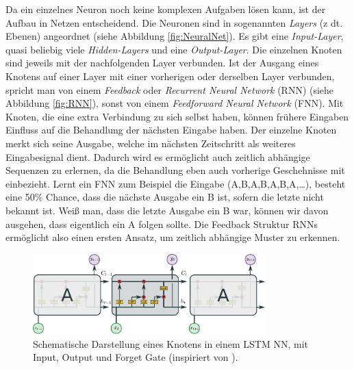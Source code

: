     Da ein einzelnes Neuron noch keine komplexen Aufgaben lösen kann, ist der Aufbau in Netzen entscheidend.
    Die Neuronen sind in sogenannten \textit{Layers} (z dt. Ebenen) angeordnet (siehe Abbildung \ref{fig:NeuralNet}).
    Es gibt eine \textit{Input-Layer}, quasi beliebig viele \textit{Hidden-Layers} und eine \textit{Output-Layer}.
    Die einzelnen Knoten sind jeweils mit der nachfolgenden Layer verbunden.
    Ist der Ausgang eines Knotens auf einer Layer mit einer vorherigen oder derselben Layer verbunden, spricht man von einem \textit{Feedback} oder \textit{Recurrent Neural Network} (RNN) (siehe Abbildung \ref{fig:RNN}), sonst von einem \textit{Feedforward Neural Network} (FNN). 
    Mit Knoten, die eine extra Verbindung zu sich selbst haben, können frühere Eingaben Einfluss auf die Behandlung der nächsten Eingabe haben.
    Der einzelne Knoten merkt sich seine Ausgabe, welche im nächsten Zeitschritt als weiteres Eingabesignal dient.
    Dadurch wird es ermöglicht auch zeitlich abhängige Sequenzen zu erlernen, da die Behandlung eben auch vorherige Geschehnisse mit einbezieht.
    Lernt ein FNN zum Beispiel die Eingabe (A,B,A,B,A,B,A,\dots), besteht eine 50\% Chance, dass die nächste Ausgabe ein B ist, sofern die letzte nicht bekannt ist.
    Weiß man, dass die letzte Ausgabe ein B war, können wir davon ausgehen, dass eigentlich ein A folgen sollte.
    Die Feedback Struktur RNNs ermöglicht also einen ersten Ansatz, um zeitlich abhängige Muster zu erkennen.
    
    	\begin{figure}[ht]
    		\centering
    		\includegraphics[width=0.8\textwidth]{images/Illustrationen/LSTM}
    		\caption{Schematische Darstellung eines Knotens in einem LSTM NN, mit Input, Output und Forget Gate (inspiriert von \cite{OLAH2015}).}
    		\label{fig:LSTM}
    	\end{figure}
   	
